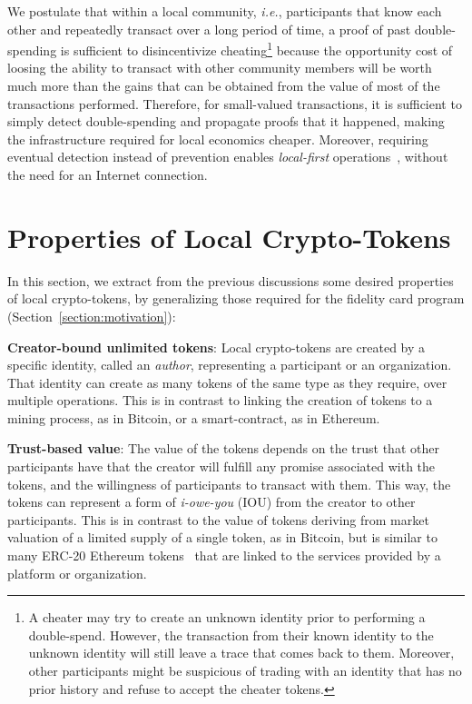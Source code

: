 \documentclass[sigconf,9pt]{acmart}
\begin{document}
We postulate that within a local community, \textit{i.e.}, participants that know each other and repeatedly transact over a long period of time, a proof of past double-spending is sufficient to disincentivize cheating\footnote{A cheater may try to create an unknown identity prior to performing a double-spend. However, the transaction from their known identity to the unknown identity will still leave a trace that comes back to them. Moreover, other participants might be suspicious of trading with an identity that has no prior history and refuse to accept the cheater tokens.} because the opportunity cost of loosing the ability to transact with other community members will be worth much more than the gains that can be obtained from the value of most of the transactions performed. Therefore, for small-valued transactions, it is sufficient to simply detect double-spending and propagate proofs that it happened, making the infrastructure required for local economics cheaper. Moreover, requiring eventual detection instead of prevention enables \textit{local-first} operations~\cite{kleppmann2019local-first-software}, without the need for an Internet connection.

\section{Properties of Local Crypto-Tokens}
\label{section:problem}

In this section, we extract from the previous discussions some desired properties of local crypto-tokens, by generalizing those required for the fidelity card program (Section~\ref{section:motivation}):

\textbf{Creator-bound unlimited tokens}: Local crypto-tokens are created by a specific identity, called an \textit{author}, representing a participant or an organization. That identity can create as many tokens of the same type as they require, over multiple operations. This is in contrast to linking the creation of tokens to a mining process, as in Bitcoin, or a smart-contract, as in Ethereum.

\textbf{Trust-based value}:  The value of the tokens depends on the trust that other participants have that the creator will fulfill any promise associated with the tokens, and the willingness of participants to transact with them. This way, the tokens can represent a form of \textit{i-owe-you} (IOU) from the creator to other participants. This is in contrast to the value of tokens deriving from market valuation of a limited supply of a single token, as in Bitcoin, but is similar to many ERC-20 Ethereum tokens~\cite{erc20} that are linked to the services provided by a platform or organization.
\end{document}
